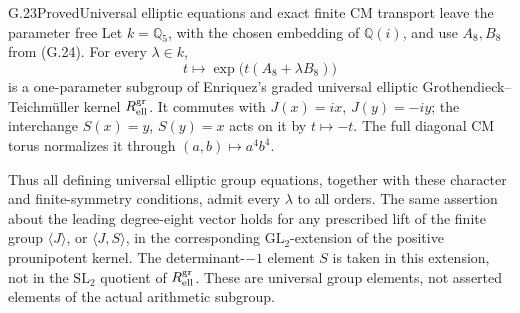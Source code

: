 \begin{statement}{G.23}{Proved}{Universal elliptic equations and exact finite CM transport leave the parameter free}
Let $k=\mathbb Q_5$, with the chosen embedding of $\mathbb Q(i)$,
and use $A_8,B_8$ from (G.24). For every $\lambda\in k$,
\[
             t\longmapsto\exp\bigl(t(A_8+\lambda B_8)\bigr)
\]
is a one-parameter subgroup of Enriquez's graded universal elliptic
Grothendieck--Teichm\"uller kernel $R_{\rm ell}^{\rm gr}$.
It commutes with $J(x)=ix$, $J(y)=-iy$; the interchange
$S(x)=y$, $S(y)=x$ acts on it by $t\mapsto-t$.
The full diagonal CM torus normalizes it through
$(a,b)\mapsto a^4b^4$.

Thus all defining universal elliptic group equations, together
with these character and finite-symmetry conditions, admit every
$\lambda$ to all orders. The same assertion about the leading
degree-eight vector holds for any prescribed lift of the finite
group $\langle J\rangle$, or $\langle J,S\rangle$, in the
corresponding $\mathrm{GL}_2$-extension of the positive
prounipotent kernel. The determinant-$-1$ element $S$ is taken
in this extension, not in the $\mathrm{SL}_2$ quotient of
$R_{\rm ell}^{\rm gr}$. These are universal group
elements, not asserted elements of the actual arithmetic subgroup.
\end{statement}
